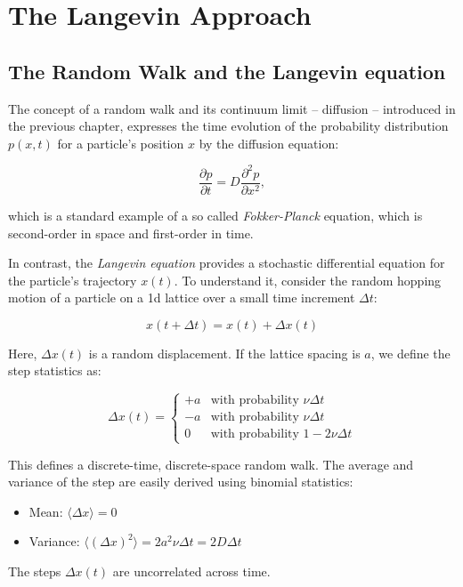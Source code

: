 \documentclass[
  letterpaper,
  enabledeprecatedfontcommands]{report}
\begin{document}
\chapter{The Langevin Approach}\label{the-langevin-approach}

\section{The Random Walk and the Langevin
equation}\label{the-random-walk-and-the-langevin-equation}

The concept of a random walk and its continuum limit -- diffusion --
introduced in the previous chapter, expresses the time evolution of the
probability distribution \(p(x, t)\) for a particle's position \(x\) by
the diffusion equation:

\[
\frac{\partial p}{\partial t} = D \frac{\partial^2 p}{\partial x^2},
\]

which is a standard example of a so called \emph{Fokker-Planck}
equation, which is second-order in space and first-order in time.

In contrast, the \emph{Langevin equation} provides a stochastic
differential equation for the particle's trajectory \(x(t)\). To
understand it, consider the random hopping motion of a particle on a 1d
lattice over a small time increment \(\Delta t\):

\[
x(t + \Delta t) = x(t) + \Delta x(t)
\]

Here, \(\Delta x(t)\) is a random displacement. If the lattice spacing
is \(a\), we define the step statistics as:

\[
\Delta x(t) = 
\begin{cases}
+a & \text{with probability } \nu \Delta t \\
-a & \text{with probability } \nu \Delta t \\
0 & \text{with probability } 1 - 2\nu \Delta t
\end{cases}
\]

This defines a discrete-time, discrete-space random walk. The average
and variance of the step are easily derived using binomial statistics:

\begin{itemize}
\item
  Mean: \(\langle \Delta x \rangle = 0\)
\item
  Variance:
  \(\langle (\Delta x)^2 \rangle = 2 a^2 \nu \Delta t = 2D \Delta t\)
\end{itemize}

The steps \(\Delta x(t)\) are uncorrelated across time.
\end{document}
